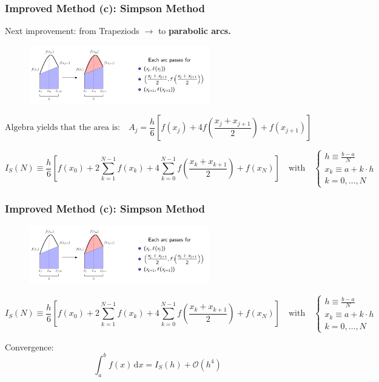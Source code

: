 \documentclass[11pt,aspectratio=169,handout]{beamer}
\begin{document}
\begin{frame}
	\frametitle{Improved Method (c): Simpson Method}
	Next improvement: from Trapeziods $\rightarrow$ to \textbf{parabolic arcs.}
	\pause
	\begin{figure}
		\centering
		\includegraphics[width=0.7\textwidth]{fig/integration-simpson-with-text}
	\end{figure}%
	\pause
	\begin{equation*}
		\text{Algebra yields that the area is:} \quad A_j = \frac{h}{6} \left[ f(x_j) + 4 f\left(\frac{x_j + x_{j+1}}{2}\right) + f(x_{j+1}) \right]
	\end{equation*}
	
	\pause
	\begin{equation*}
		I_S(N) \equiv \frac{h}{6} \left[ f(x_0) + 2\sum_{k=1}^{N-1} f(x_k)+4\sum_{k=0}^{N-1}f\left(\frac{x_k + x_{k+1}}{2}\right) + f(x_{N}) \right] 
		\quad \text{with} \quad
		\begin{cases}
			h \equiv \frac{b-a}{N} \\
			x_k \equiv a + k \cdot h \\
			k = 0, \ldots, N
		\end{cases}
	\end{equation*}
	
\end{frame}

\begin{frame}
	\frametitle{Improved Method (c): Simpson Method}
	\begin{figure}
		\centering
		\includegraphics[width=0.7\textwidth]{fig/integration-simpson-with-text}
	\end{figure}%
	\begin{equation*}
		I_S(N) \equiv \frac{h}{6} \left[ f(x_0) + 2\sum_{k=1}^{N-1} f(x_k)+4\sum_{k=0}^{N-1}f\left(\frac{x_k + x_{k+1}}{2}\right) + f(x_{N}) \right] 
		\quad \text{with} \quad
		\begin{cases}
			h \equiv \frac{b-a}{N} \\
			x_k \equiv a + k \cdot h \\
			k = 0, \ldots, N
		\end{cases}
	\end{equation*}
	
	Convergence:
	\begin{equation*}
		\int_a^b f(x) \, \mathrm{d}x = I_S(h) + \mathcal{O}\left(h^4\right)
	\end{equation*}
	
\end{frame}
\end{document}
